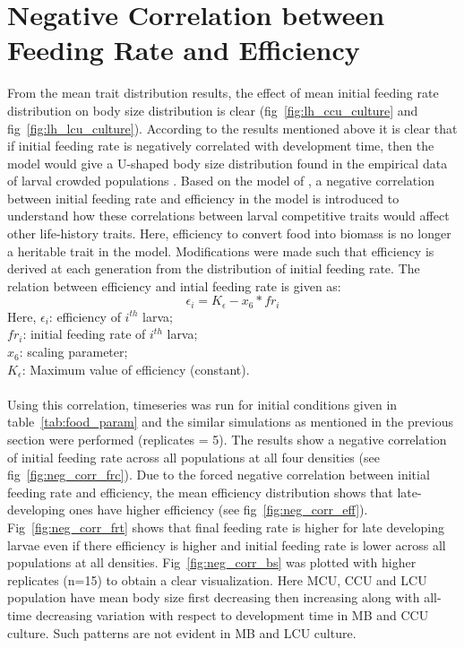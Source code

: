 \section{Negative Correlation between Feeding Rate and Efficiency}
From the mean trait distribution results, the effect of mean initial feeding rate distribution on body size distribution is clear (fig~\ref{fig:lh_ccu_culture} and fig~\ref{fig:lh_lcu_culture}). According to the results mentioned above it is clear that if initial feeding rate is negatively correlated with development time, then the model would give a U-shaped body size distribution found in the empirical data of larval crowded populations \citep{sarangiEcologicalDetailsMediate2018}. Based on the model of \citep{muellerModelEvolutionLarval2015}, a negative correlation between initial feeding rate and efficiency in the model is introduced to understand how these correlations between larval competitive traits would affect other life-history traits. Here, efficiency to convert food into biomass is no longer a heritable trait in the model. Modifications were made such that efficiency is derived at each generation from the distribution of initial feeding rate. The relation between efficiency and intial feeding rate is given as:
\[\epsilon_{i} = K_{\epsilon} - x_{6}*fr_{i}\]
Here,
$\epsilon_{i}$: efficiency of $i^{th}$ larva;\\
$fr_{i}$: initial feeding rate of $i^{th}$ larva;\\
$x_{6}$: scaling parameter;\\
$K_{\epsilon}$: Maximum value of efficiency (constant).\\\\
Using this correlation, timeseries was run for initial conditions given in table~\ref{tab:food_param} and the similar simulations as mentioned in the previous section were performed (replicates = 5). The results show a negative correlation of initial feeding rate across all populations at all four densities (see fig~\ref{fig:neg_corr_frc}). Due to the forced negative correlation between initial feeding rate and efficiency, the mean efficiency distribution shows that late-developing ones have higher efficiency (see fig~\ref{fig:neg_corr_eff}). Fig~\ref{fig:neg_corr_frt} shows that final feeding rate is higher for late developing larvae even if there efficiency is higher and initial feeding rate is lower across all populations at all densities. Fig~\ref{fig:neg_corr_bs} was plotted with higher replicates (n=15) to obtain a clear visualization. Here MCU, CCU and LCU population have mean body size first decreasing then increasing along with all-time decreasing variation with respect to development time in MB and CCU culture. Such patterns are not evident in MB and LCU culture.
